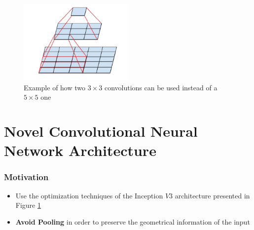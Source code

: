 \documentclass[a0, portrait]{IWIposter}
\begin{document}
\begin{multicols}{3}
\begin{itemize}
\end{itemize}

\begin{figure}[H]
	\centering
	\includegraphics[width=0.5\textwidth]{ConvolutionsExample.png}
	\caption{Example of how two $3 \times 3$ convolutions can be used instead of a $5 \times 5$ one}
	\label{fig:ConvolutionsExample}
\end{figure}



\section*{Novel Convolutional Neural Network Architecture}

\centering
\subsubsection*{Motivation}
	\begin{itemize}
		\item Use the optimization techniques of the Inception $V3$ architecture presented in Figure \ref{fig:ConvolutionsExample}
		\item \textbf{Avoid Pooling} in order to preserve the geometrical information of the input

	\end{itemize}

\centering

\end{multicols}
\end{document}
